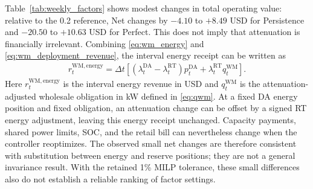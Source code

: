\documentclass[final,5p,times]{elsarticle}
\newcommand{\dt}{\Delta t}
\newcommand{\DA}{\mathrm{DA}}
\newcommand{\RT}{\mathrm{RT}}
\newcommand{\WM}{\mathrm{WM}}
\begin{document}
Table~\ref{tab:weekly_factors} shows modest changes in total operating value:
relative to the 0.2 reference, Net changes by $-4.10$ to $+8.49$ USD for
Persistence and $-20.50$ to $+10.63$ USD for Perfect. This does not imply
that attenuation is financially irrelevant. Combining
\eqref{eq:wm_energy} and \eqref{eq:wm_deployment_revenue}, the interval
energy receipt can be written as
\begin{align}
r_t^{\WM,\mathrm{energy}}
=\dt\left[(\lambda_t^{\DA}-\lambda_t^{\RT})p_t^{\DA}
+\lambda_t^{\RT}q_t^{\WM}\right].
\label{eq:sensitivity_energy_identity}
\end{align}
Here $r_t^{\WM,\mathrm{energy}}$ is the interval energy revenue in USD and
$q_t^{\WM}$ is the attenuation-adjusted wholesale obligation in kW defined
in \eqref{eq:qwm}. At a fixed DA energy position and fixed obligation, an
attenuation change can be offset by a signed RT energy adjustment, leaving
this energy receipt unchanged. Capacity payments, shared power limits, SOC,
and the retail bill can nevertheless change when the controller reoptimizes.
The observed small net changes are therefore consistent with substitution
between energy and reserve positions; they are not a general invariance
result. With the retained 1\% MILP tolerance, these small differences also
do not establish a reliable ranking of factor settings.
\end{document}
